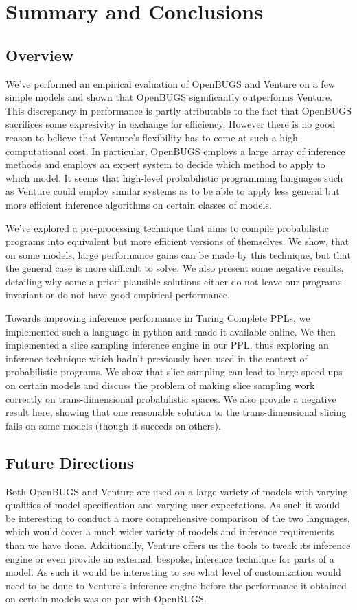 \chapter{Summary and Conclusions}
\label{chap:conc}

\section{Overview}
We've performed an empirical evaluation of OpenBUGS and Venture on a few simple models and shown that OpenBUGS significantly outperforms Venture. This discrepancy in performance is partly atributable to the fact that OpenBUGS sacrifices some expresivity in exchange for efficiency. However there is no good reason to believe that Venture's flexibility has to come at such a high computational cost. In particular, OpenBUGS employs a large array of inference methods and employs an expert system to decide which method to apply to which model. It seems that high-level probabilistic programming languages such as Venture could employ similar systems as to be able to apply less general but more efficient inference algorithms on certain classes of models.

We've explored a pre-processing technique that aims to compile probabilistic programs into equivalent but more efficient versions of themselves. We show, that on some models, large performance gains can be made by this technique, but that the general case is more difficult to solve. We also present some negative results, detailing why some a-priori plausible solutions either do not leave our programs invariant or do not have good empirical performance.

Towards improving inference performance in Turing Complete PPLs, we implemented such a language in python and made it available online. We then implemented a slice sampling inference engine in our PPL, thus exploring an inference technique which hadn't previously been used in the context of probabilistic programs. We show that slice sampling can lead to large speed-ups on certain models and discuss the problem of making slice sampling work correctly on trans-dimensional probabilistic spaces. We also provide a negative result here, showing that one reasonable solution to the trans-dimensional slicing fails on some models (though it suceeds on others).

\section{Future Directions}
Both OpenBUGS and Venture are used on a large variety of models with varying qualities of model specification and varying user expectations. As such it would be interesting to conduct a more comprehensive comparison of the two languages, which would cover a much wider variety of models and inference requirements than we have done. Additionally, Venture offers us the tools to tweak its inference engine or even provide an external, bespoke, inference technique for parts of a model. As such it would be interesting to see what level of customization would need to be done to Venture's inference engine before the performance it obtained on certain models was on par with OpenBUGS.

